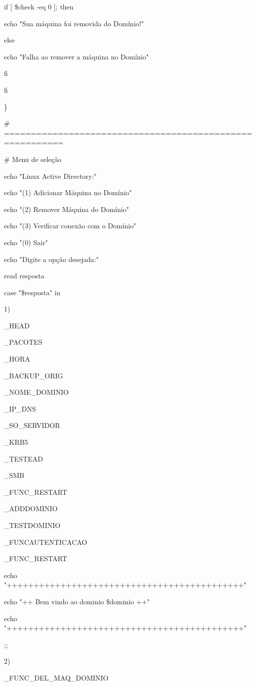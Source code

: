 {      if [ \$check -eq 0 ]; then

         echo "Sua máquina foi removida do Domínio!"

      else

         echo "Falha ao remover a máquina no Domínio"

      fi

   fi

\}

\# =========================================================

\# Menu de seleção

echo "Linux Active Directory:"

echo "(1) Adicionar Máquina no Domínio"

echo "(2) Remover Máquina do Domínio"

echo "(3) Verificar conexão com o Domínio"

echo "(0) Sair"

echo "Digite a opção desejada:"

read resposta

case "\$resposta" in

        1)  

      \_HEAD

      \_PACOTES

      \_HORA

      \_BACKUP\_ORIG

      \_NOME\_DOMINIO

      \_IP\_DNS

      \_SO\_SERVIDOR

      \_KRB5

      \_TESTEAD

      \_SMB

      \_FUNC\_RESTART

      \_ADDDOMINIO

      \_TESTDOMINIO

      \_FUNCAUTENTICACAO

      \_FUNC\_RESTART

      echo "++++++++++++++++++++++++++++++++++++++++++++"

      echo "++ Bem vindo ao dominio \$dominio ++"

      echo "++++++++++++++++++++++++++++++++++++++++++++"

                ;;  

        2)  

       \_FUNC\_DEL\_MAQ\_DOMINIO

}
